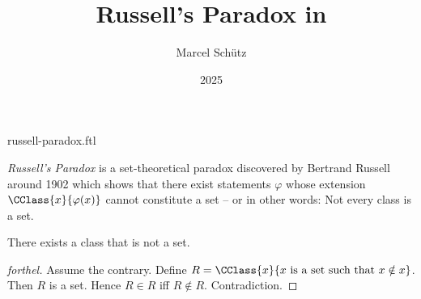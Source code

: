 \documentclass{stex}
\title{Russell's Paradox in \Naproche}
\author{Marcel Schütz}
\date{2025}
\begin{document}
\begin{smodule}{russell-paradox.ftl}


\maketitle

\noindent \emph{Russell's Paradox} is a set-theoretical paradox discovered by
Bertrand Russell around 1902 \cite[chapter XV]{Frege1980} which shows that 
there exist statements $\varphi$ whose extension
$\CClass{x}{\varphi(x)}$ cannot constitute a set -- or in other words:
Not every class is a set.

\begin{forthel}
  \begin{theorem}[title=Russell's Paradox]
    There exists a class that is not a set.
  \end{theorem}
  \begin{proof}[forthel]
    Assume the contrary.
    Define $R = \CClass{x}{x \text{ is a set such that } x \notin x}$.
    Then $R$ is a set.
    Hence $R \in R$ iff $R \notin R$.
    Contradiction.
  \end{proof}
\end{forthel}

\printbibliography
{}
\end{smodule}
\end{document}
